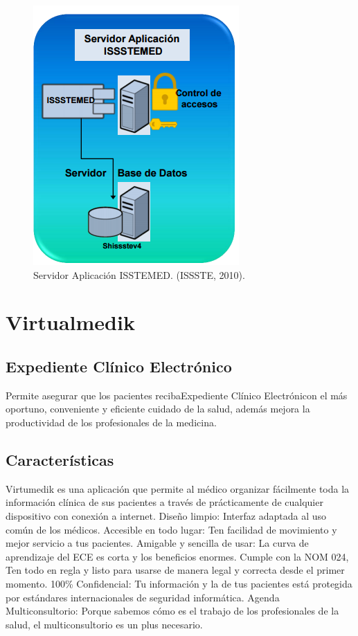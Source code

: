 \begin{figure}[h]
  \centering
  \label{figura1}
  \includegraphics[scale=.35]{lib/assets/1}
  \caption{Servidor Aplicación ISSTEMED. (ISSSTE, 2010).}
\end{figure}






\section{Virtualmedik}

\subsection{Expediente Clínico Electrónico}
Permite asegurar que los pacientes recibaExpediente Clínico Electrónicon el más oportuno, conveniente y eficiente cuidado de la salud, además mejora la productividad de los profesionales de la medicina. \cite{Villareal}

\subsection{Características}
Virtumedik es una aplicación que permite al médico organizar fácilmente toda la información clínica de sus pacientes a través de prácticamente de cualquier dispositivo con conexión a internet.
Diseño limpio: Interfaz adaptada al uso común de los médicos.
Accesible en todo lugar: Ten facilidad de movimiento y mejor servicio a tus pacientes.
Amigable y sencilla de usar: La curva de aprendizaje del ECE es corta y los beneficios enormes.
Cumple con la NOM 024, Ten todo en regla y listo para usarse de manera legal y correcta desde el primer momento.
100\% Confidencial: Tu información y la de tus pacientes está protegida por estándares internacionales de seguridad informática.
Agenda Multiconsultorio: Porque sabemos cómo es el trabajo de los profesionales de la salud, el multiconsultorio es un plus necesario.\cite{Villareal}
